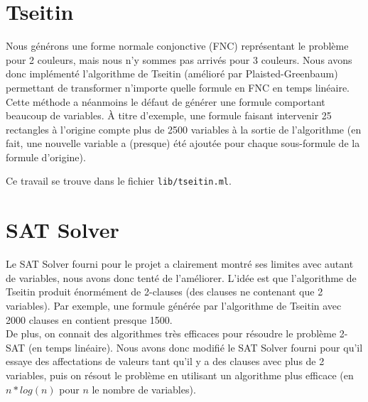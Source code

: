 \documentclass[10pt,a4paper]{article}
\begin{document}
\section{Tseitin}
Nous générons une forme normale conjonctive (FNC) représentant le problème pour 2 couleurs, mais nous n'y sommes pas arrivés pour 3 couleurs. Nous avons donc implémenté l'algorithme de Tseitin (amélioré par Plaisted-Greenbaum) permettant de transformer n'importe quelle formule en FNC en temps linéaire.
Cette méthode a néanmoins le défaut de générer une formule comportant beaucoup de variables. À titre d'exemple, une formule faisant intervenir 25 rectangles à l'origine compte plus de 2500 variables à la sortie de l'algorithme (en fait, une nouvelle variable a (presque) été ajoutée pour chaque sous-formule de la formule d'origine).

Ce travail se trouve dans le fichier \verb|lib/tseitin.ml|.

\section{SAT Solver}
Le SAT Solver fourni pour le projet a clairement montré ses limites avec autant de variables, nous avons donc tenté de l'améliorer. L'idée est que l'algorithme de Tseitin produit énormément de 2-clauses (des clauses ne contenant que 2 variables). Par exemple, une formule générée par l'algorithme de Tseitin avec 2000 clauses en contient presque 1500.\\
De plus, on connait des algorithmes très efficaces pour résoudre le problème 2-SAT (en temps linéaire). Nous avons donc modifié le SAT Solver fourni pour qu'il essaye des affectations de valeurs tant qu'il y a des clauses avec plus de 2 variables, puis on résout le problème en utilisant un algorithme plus efficace (en $n*log(n)$ pour $n$ le nombre de variables).
\end{document}
